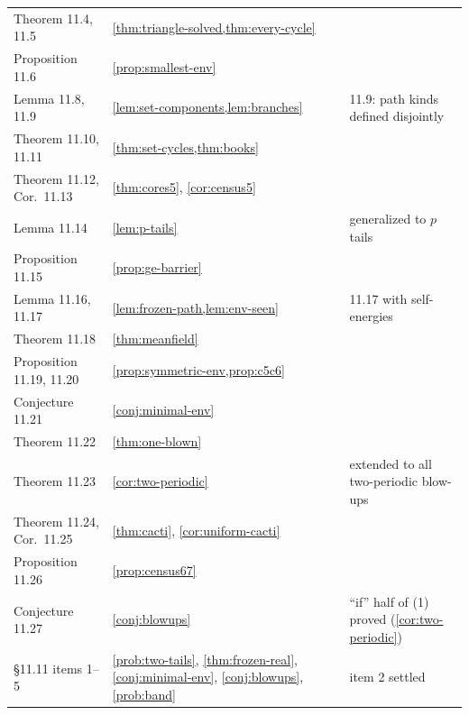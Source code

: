 \documentclass[11pt]{amsart}
\theoremstyle{plain}
\theoremstyle{definition}
\theoremstyle{remark}
\numberwithin{equation}{section}
\begin{document}
\begin{center}
\begin{longtable}{@{}L{0.29}L{0.33}L{0.31}@{}}
Theorem 11.4, 11.5 & \cref{thm:triangle-solved,thm:every-cycle} & \\
Proposition 11.6 & \cref{prop:smallest-env} & \\
Lemma 11.8, 11.9 & \cref{lem:set-components,lem:branches} & 11.9: path kinds defined disjointly\\
Theorem 11.10, 11.11 & \cref{thm:set-cycles,thm:books} & \\
Theorem 11.12, Cor.\ 11.13 & \cref{thm:cores5}, \cref{cor:census5} & \\
Lemma 11.14 & \cref{lem:p-tails} & generalized to $p$ tails\\
Proposition 11.15 & \cref{prop:ge-barrier} & \\
Lemma 11.16, 11.17 & \cref{lem:frozen-path,lem:env-seen} & 11.17 with self-energies\\
Theorem 11.18 & \cref{thm:meanfield} & \\
Proposition 11.19, 11.20 & \cref{prop:symmetric-env,prop:c5c6} & \\
Conjecture 11.21 & \cref{conj:minimal-env} & \\
Theorem 11.22 & \cref{thm:one-blown} & \\
Theorem 11.23 & \cref{cor:two-periodic} & extended to all two-periodic blow-ups\\
Theorem 11.24, Cor.\ 11.25 & \cref{thm:cacti}, \cref{cor:uniform-cacti} & \\
Proposition 11.26 & \cref{prop:census67} & \\
Conjecture 11.27 & \cref{conj:blowups} & ``if'' half of (1) proved (\cref{cor:two-periodic})\\
\S11.11 items 1--5 & \cref{prob:two-tails}, \cref{thm:frozen-real}, \cref{conj:minimal-env}, \cref{conj:blowups}, \cref{prob:band} & item 2 settled\\
\bottomrule
\end{longtable}
\end{center}
\end{document}
